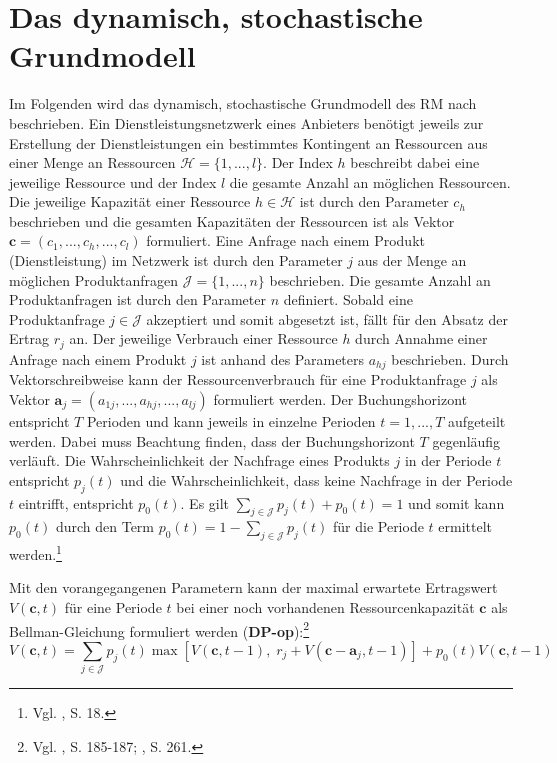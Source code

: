 \section{Das dynamisch, stochastische Grundmodell}\label{Grundmodell}
Im Folgenden wird das dynamisch, stochastische Grundmodell des RM nach \cite{talluri2004revenue} beschrieben. Ein Dienstleistungsnetzwerk eines Anbieters benötigt jeweils zur Erstellung der Dienstleistungen ein bestimmtes Kontingent an Ressourcen aus einer Menge an Ressourcen $\mathcal{H} = \{1,...,l \}$. Der Index $h$ beschreibt dabei eine jeweilige Ressource und der Index $l$ die gesamte Anzahl an möglichen Ressourcen. Die jeweilige Kapazität einer Ressource $h \in \mathcal{H}$ ist durch den Parameter $c_{h}$ beschrieben und die gesamten Kapazitäten der Ressourcen ist als Vektor $\textbf{c}=(c_{1},...,c_{h},...,c_{l})$ formuliert. Eine Anfrage nach einem Produkt (Dienstleistung) im Netzwerk ist durch den Parameter $j$ aus der Menge an möglichen Produktanfragen $\mathcal{J} = \{1,...,n \}$ %
beschrieben. Die gesamte Anzahl an Produktanfragen ist durch den Parameter $n$ definiert. Sobald eine Produktanfrage $j\in \mathcal{J}$ akzeptiert und somit abgesetzt ist, fällt für den Absatz der Ertrag $r_{j}$ an. Der jeweilige Verbrauch einer Ressource $h$ durch Annahme einer Anfrage nach einem Produkt $j$ ist anhand des Parameters $a_{hj}$ beschrieben. Durch Vektorschreibweise kann der Ressourcenverbrauch für eine Produktanfrage $j$ als Vektor $\textbf{a}_{j}=(a_{1j},...,a_{hj},...,a_{lj})$ formuliert werden. Der Buchungshorizont entspricht $T$ Perioden und kann jeweils in einzelne Perioden $t=1,...,T$ aufgeteilt werden. Dabei muss Beachtung finden, dass der Buchungshorizont $T$ gegenläufig verläuft. Die Wahrscheinlichkeit der Nachfrage eines Produkts $j$ in der Periode $t$ entspricht $p_{j}(t)$ und die Wahrscheinlichkeit, dass keine Nachfrage in der Periode $t$ eintrifft, entspricht $p_{0}(t)$. Es gilt $\sum_{j\in \mathcal{J}}p_{j}(t)+p_{0}(t)=1$ und somit kann $p_{0}(t)$ durch den Term $p_{0}(t)=1-\sum_{j\in \mathcal{J}}p_{j}(t)$ für die Periode $t$ ermittelt werden.\footnote{Vgl. \citeauthor{talluri2004revenue}, S. 18.} %


Mit den vorangegangenen Parametern kann der maximal erwartete Ertragswert $V(\textbf{c},t)$ für eine Periode $t$ bei einer noch vorhandenen Ressourcenkapazität $\textbf{c}$ als Bellman-Gleichung formuliert werden (\textbf{DP-op}):\footnote{Vgl. \cite{Petrick:2009aa}, S. 185-187; \cite{doi:10.1287/trsc.37.3.257.16047}, S. 261.}
\begin{equation}\label{DP}
V(\textbf{c},t)=\sum_{j\in\mathcal{J}}p_{j}(t)\max[ V(\textbf{c},t-1),\; r_{j}+V(\textbf{c}-\textbf{a}_{j},t-1)]+p_{0}(t)V(\textbf{c},t-1)
\end{equation}


